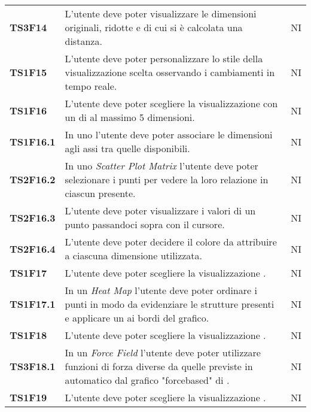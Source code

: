 {\begin{longtable}{ C{2cm} | C{12cm}| C{1.5cm} }
\textbf{TS3F14} & 
L'utente deve poter visualizzare le dimensioni originali, ridotte e di cui si è calcolata una distanza. & 
NI\\

\textbf{TS1F15} & 
L'utente deve poter personalizzare lo stile della visualizzazione scelta osservando i cambiamenti in tempo reale. & 
NI\\

\textbf{TS1F16} & 
L'utente deve poter scegliere la visualizzazione  con un  di al massimo 5 dimensioni. & 
NI\\

\textbf{TS1F16.1} & 
In uno  l'utente deve poter associare le dimensioni agli assi tra quelle disponibili. & 
NI\\

\textbf{TS2F16.2} & 
In uno \textit{Scatter Plot Matrix} l'utente deve poter selezionare i punti per vedere la loro relazione in ciascun  presente. & 
NI\\

\textbf{TS2F16.3} & 
L'utente deve poter visualizzare i valori di un punto passandoci sopra con il cursore. & 
NI\\

\textbf{TS2F16.4} & 
L'utente deve poter decidere il colore da attribuire a ciascuna dimensione utilizzata. & 
NI\\

\textbf{TS1F17} & 
L'utente deve poter scegliere la visualizzazione . & 
NI\\

\textbf{TS1F17.1} & 
In un \textit{Heat Map} l'utente deve poter ordinare i punti in modo da evidenziare le strutture presenti e applicare un  ai bordi del grafico. & 
NI\\

\textbf{TS1F18} & 
L'utente deve poter scegliere la visualizzazione . & 
NI\\

\textbf{TS3F18.1} & 
In un \textit{Force Field} l'utente deve poter utilizzare funzioni di forza diverse da quelle previste in automatico dal grafico "forcebased" di . & 
NI\\

\textbf{TS1F19} & 
L'utente deve poter scegliere la visualizzazione . & 
NI\\


\end{longtable}}
